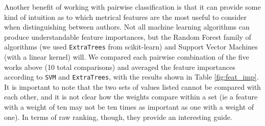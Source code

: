 \documentclass[11pt,a4paper]{scrartcl} %
\begin{document}
{Another benefit of working with pairwise classification is that it can provide some kind of intuition as to which metrical features are the most useful to consider when distinguishing between authors. Not all machine learning algorithms can produce understandable feature importances, but the Random Forest family of algorithms (we used \texttt{ExtraTrees} from scikit-learn) and Support Vector Machines (with a linear kernel) will. We compared each pairwise combination of the five works above (10 total comparisons) and averaged the feature importances according to \texttt{SVM} and \texttt{ExtraTrees}, with the results shown in Table \ref{fig:feat_imp}. It is important to note that the two sets of values listed cannot be compared with each other, and it is not clear how the weights compare within a set (ie a feature with a weight of ten may not be ten times as important as one with a weight of one). In terms of raw ranking, though, they provide an interesting guide. 
\begin{table}
\caption{Ranked Feature Importances, as determined by \texttt{ExtraTrees} and \texttt{SVM}}
\label{fig:feat_imp}
\phantom{x}
\centering
{}
\end{table}
}
\end{document}
